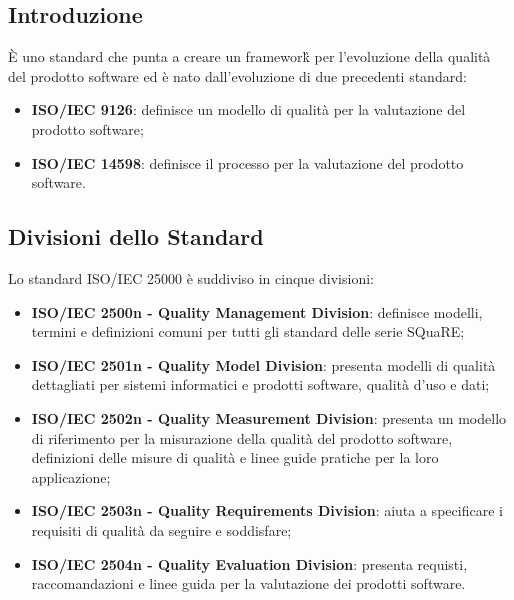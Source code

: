 \subsection{Introduzione}
È uno standard che punta a creare un framework\G{} per l'evoluzione della qualità del prodotto software ed è nato dall'evoluzione di due precedenti standard:
\begin{itemize}
	\item \textbf{ISO/IEC 9126}: definisce un modello di qualità per la valutazione del prodotto software;
	\item \textbf{ISO/IEC 14598}: definisce il processo per la valutazione del prodotto software.
\end{itemize}

\subsection{Divisioni dello Standard}
Lo standard ISO/IEC 25000 è suddiviso in cinque divisioni:
\begin{itemize}
	\item \textbf{ISO/IEC 2500n - Quality Management Division}: definisce modelli, termini e definizioni comuni per tutti gli standard delle serie SQuaRE;
	\item \textbf{ISO/IEC 2501n - Quality Model Division}: presenta modelli di qualità dettagliati per sistemi informatici e prodotti software, qualità d'uso e dati;
	\item \textbf{ISO/IEC 2502n - Quality Measurement Division}: presenta un modello di riferimento per la misurazione della qualità del prodotto software, definizioni delle misure di qualità e linee guide pratiche per la loro applicazione;
	\item \textbf{ISO/IEC 2503n - Quality Requirements Division}: aiuta a specificare i requisiti di qualità da seguire e soddisfare;
	\item \textbf{ISO/IEC 2504n - Quality Evaluation Division}: presenta requisti, raccomandazioni e linee guida per la valutazione dei prodotti software.
\end{itemize}

